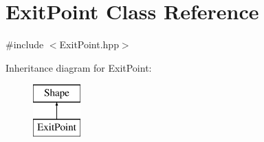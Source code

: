 \hypertarget{class_exit_point}{}\section{Exit\+Point Class Reference}
\label{class_exit_point}


{\ttfamily \#include $<$Exit\+Point.\+hpp$>$}

Inheritance diagram for Exit\+Point\+:\begin{figure}[H]
\begin{center}
\leavevmode
\includegraphics[height=2.000000cm]{class_exit_point}
\end{center}
\end{figure}

